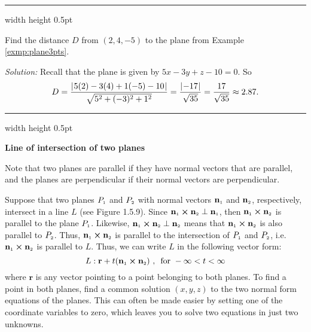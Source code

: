 \hrule width \textwidth height 0.5pt
\begin{exmp}\label{exmp:distptplane}
 Find the distance $D$ from $(2,4,-5)$ to the plane from Example \ref{exmp:plane3pts}.\smallskip
 \par\noindent\emph{Solution:} Recall that the plane is given by $5x - 3y + z - 10 = 0$. So
 \begin{displaymath}
  D = \frac{\lvert\mspace{1mu}5(2) - 3(4) + 1(-5) - 10\mspace{1mu}\rvert}{\sqrt{5^2 + (-3)^2 + 1^2}} = \frac{\lvert\mspace{1mu}-17\mspace{1mu}\rvert}{\sqrt{35}} =
   \frac{17}{\sqrt{35}} \approx 2.87.
 \end{displaymath}
\end{exmp}
\hrule width \textwidth height 0.5pt
\pagebreak[3]
\par\noindent\textbf{\large{Line of intersection of two planes}}\normalsize\smallskip

\piccaption[]{}
Note that two planes are parallel if they have normal vectors that are parallel, and the planes are perpendicular if
their normal vectors are perpendicular. 

Suppose
that two planes $P_{\scriptscriptstyle 1}$ and $P_{\scriptscriptstyle 2}$ with normal vectors $\mathbf{n}_{\scriptscriptstyle 1}$ and $\mathbf{n}_{\scriptscriptstyle 2}$,
respectively, intersect in a line $L$ (see Figure 1.5.9). 
Since $\mathbf{n}_{\scriptscriptstyle 1} \bm{\times} \mathbf{n}_{\scriptscriptstyle 2} \perp
\mathbf{n}_{\scriptscriptstyle 1}$, then $\mathbf{n}_{\scriptscriptstyle 1} \bm{\times} \mathbf{n}_{\scriptscriptstyle 2}$ is parallel to the plane
$P_{\scriptscriptstyle 1}$. 
Likewise, $\mathbf{n}_{\scriptscriptstyle 1} \bm{\times} \mathbf{n}_{\scriptscriptstyle 2} \perp \mathbf{n}_{\scriptscriptstyle 2}$ means
that $\mathbf{n}_{\scriptscriptstyle 1} \bm{\times} \mathbf{n}_{\scriptscriptstyle 2}$ is also parallel to $P_{\scriptscriptstyle 2}$. 
Thus,
$\mathbf{n}_{\scriptscriptstyle 1} \bm{\times} \mathbf{n}_{\scriptscriptstyle 2}$ is parallel to the intersection of $P_{\scriptscriptstyle 1}$ and
$P_{\scriptscriptstyle 2}$, i.e. $\mathbf{n}_{\scriptscriptstyle 1} \bm{\times} \mathbf{n}_{\scriptscriptstyle 2}$ is parallel to $L$. 
Thus, we can
write $L$ in the following vector form:
\begin{equation}
 L: \mathbf{r} + t(\mathbf{n}_{\scriptscriptstyle 1} \bm{\times} \mathbf{n}_{\scriptscriptstyle 2}) \text{~,~~for~} -\infty < t < \infty
\end{equation}
where $\mathbf{r}$ is any vector pointing to a point belonging to both planes. To find a point in both planes,
find a common solution $(x,y,z)$ to the two normal form equations of the planes. 
This can often be made easier
by setting one of the coordinate variables to zero, which leaves you to solve two equations in just two unknowns.

